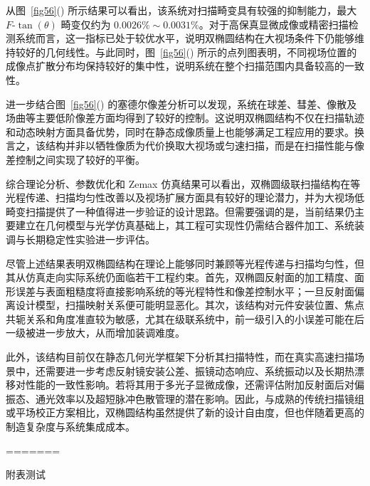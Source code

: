{从图~\ref{fig56}() 所示结果可以看出，该系统对扫描畸变具有较强的抑制能力，最大 $F$-$\tan(\theta)$ 畸变仅约为 $0.0026\%\sim0.0031\%$。对于高保真显微成像或精密扫描检测系统而言，这一指标已处于较优水平，说明双椭圆结构在大视场条件下仍能够维持较好的几何线性。与此同时，图~\ref{fig56}() 所示的点列图表明，不同视场位置的成像点扩散分布均保持较好的集中性，说明系统在整个扫描范围内具备较高的一致性。

进一步结合图~\ref{fig56}() 的塞德尔像差分析可以发现，系统在球差、彗差、像散及场曲等主要低阶像差方面均得到了较好的控制。这说明双椭圆结构不仅在扫描轨迹和动态映射方面具备优势，同时在静态成像质量上也能够满足工程应用的要求。换言之，该结构并非以牺牲像质为代价换取大视场或匀速扫描，而是在扫描性能与像差控制之间实现了较好的平衡。

综合理论分析、参数优化和 Zemax 仿真结果可以看出，双椭圆级联扫描结构在等光程传递、扫描均匀性改善以及视场扩展方面具有较好的理论潜力，并为大视场低畸变扫描提供了一种值得进一步验证的设计思路。但需要强调的是，当前结果仍主要建立在几何模型与光学仿真基础上，其工程可实现性仍需结合器件加工、系统装调与长期稳定性实验进一步评估。

尽管上述结果表明双椭圆结构在理论上能够同时兼顾等光程传递与扫描均匀性，但其从仿真走向实际系统仍面临若干工程约束。首先，双椭圆反射面的加工精度、面形误差与表面粗糙度将直接影响系统的等光程特性和像差控制水平；一旦反射面偏离设计模型，扫描映射关系便可能明显恶化。其次，该结构对元件安装位置、焦点共轭关系和角度准直较为敏感，尤其在级联系统中，前一级引入的小误差可能在后一级被进一步放大，从而增加装调难度。

此外，该结构目前仅在静态几何光学框架下分析其扫描特性，而在真实高速扫描场景中，还需要进一步考虑反射镜安装公差、振镜动态响应、系统振动以及长期热漂移对性能的一致性影响。若将其用于多光子显微成像，还需评估附加反射面后对偏振态、通光效率以及超短脉冲色散管理的潜在影响。因此，与成熟的传统扫描镜组或平场校正方案相比，双椭圆结构虽然提供了新的设计自由度，但也伴随着更高的制造复杂度与系统集成成本。




=======

附表测试
}



